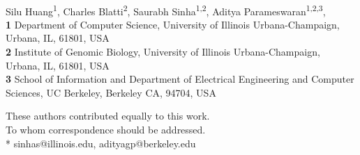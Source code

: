 \documentclass[10pt,letterpaper]{article}
\begin{document}
\vspace*{0.2in}

\begin{flushleft}
{\Large
\textbf{} %
}
\newline
\\
Silu Huang\textsuperscript{1\ddag},
Charles Blatti\textsuperscript{2\ddag},
Saurabh Sinha\textsuperscript{1,2\dag},
Aditya Parameswaran\textsuperscript{1,2,3\dag},
\\
\bigskip
\textbf{1} Department of Computer Science, University of Illinois Urbana-Champaign, Urbana, IL, 61801, USA
\\
\textbf{2} Institute of Genomic Biology, University of Illinois Urbana-Champaign, Urbana, IL, 61801, USA
\\
\textbf{3} School of Information and Department of Electrical Engineering and Computer Sciences, UC Berkeley, Berkeley CA, 94704, USA
\bigskip

%
%

\ddag These authors contributed equally to this work.
\\
\dag To whom correspondence should be addressed.
\\
* sinhas@illinois.edu, adityagp@berkeley.edu







\end{flushleft}
\end{document}
